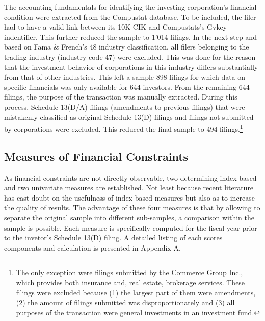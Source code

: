 \documentclass[12pt]{article}
\begin{document}
The accounting fundamentals for identifying the investing corporation's financial condition were extracted from the Compustat database. To be included, the filer had to have a valid link between its 10K-CIK and Compustats's Gvkey indentifier. This further reduced the sample to 1'014 filings. In the next step and based on Fama \& French's 48 industry classification, all filers belonging to the trading industry (industry code 47) were excluded. This was done for the reason that the investment behavior of corporations in this industry differs substantially from that of other industries. This left a sample 898 filings for which data on specific financials was only available for 644 investors. From the remaining 644 filings, the purpose of the transaction was manually extracted. During this process, Schedule 13(D/A) filings (amendments to previous filings) that were mistakenly classified as original Schedule 13(D) filings and filings not submitted by corporations were excluded. This reduced the final sample to 494 filings.\footnote{The only exception were filings submitted by the Commerce Group Inc., which provides both insurance and, real estate, brokerage services. These filings were excluded because (1) the largest part of them were amendments, (2) the amount of filings submitted was disproportionately and (3) all purposes of the transaction were general investments in an investment fund.} 

\subsection{Measures of Financial Constraints}

As financial constraints are not directly observable, two determining index-based and two univariate measures are established. Not least because recent literature has cast doubt on the usefulness \citep[p.109]{Khatami2014} of index-based measures but also as to increase the quality of results. The advantage of these four measures is that by allowing to separate the original sample into different sub-samples, a comparison within the sample is possible. Each measure is specifically computed for the fiscal year prior to the invetor's Schedule 13(D) filing. A detailed listing of each scores components and calculation is presented in Appendix A.\\
\end{document}
